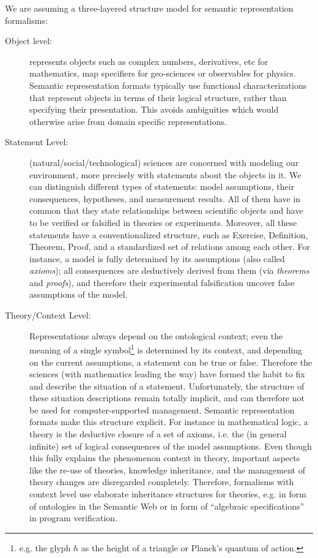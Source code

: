 \documentclass{llncs}
\begin{document}
We are assuming a three-layered structure model for semantic representation
formalisms:\label{page:levels}

\begin{description}
\item[Object level:] represents objects such as complex numbers, derivatives, etc for
  mathematics, map specifiers for geo-sciences or observables for physics.  Semantic
  re\-presentation formats typically use functional characterizations that represent
  objects in terms of their logical structure, rather than specifying their presentation.
  This avoids ambiguities which would otherwise arise from domain specific
  representations.
\item[Statement Level:] (natural/social/technological) sciences are concerned with
  modeling our environment, more precisely with statements about the objects in it. We can
  distinguish different types of statements: model assumptions, their consequences,
  hypotheses, and measurement results. All of them have in common that they state
  relationships between scientific objects and have to be verified or falsified in
  theories or experiments.  Moreover, all these statements have a conventionalized
  structure, such as Exercise, Definition, Theorem, Proof, and a standardized set of
  relations among each other. For instance, a model is fully determined by its assumptions
  (also called {\emph{axioms}}); all consequences are deductively derived from them (via
  {\emph{theorems}} and {\emph{proofs}}), and therefore their experimental falsification
  uncover false assumptions of the model.
\item[Theory/Context Level:] Representations always depend on the ontological context;
  even the meaning of a single symbol\footnote{e.g. the glyph $h$ as the height of a
    triangle or Planck's quantum of action.} is determined by its context, and depending
  on the current assumptions, a statement can be true or false. Therefore the sciences
  (with mathematics leading the way) have formed the habit to fix and describe the
  situation of a statement. Unfortunately, the structure of these situation descriptions
  remain totally implicit, and can therefore not be used for computer-supported
  management. Semantic representation formats make this structure explicit. For instance
  in mathematical logic, a theory is the deductive closure of a set of axioms, i.e. the
  (in general infinite) set of logical consequences of the model assumptions. Even though
  this fully explains the phenomenon context in theory, important aspects like the re-use
  of theories, knowledge inheritance, and the management of theory changes are disregarded
  completely. Therefore, formalisms with context level use elaborate inheritance
  structures for theories, e.g. in form of ontologies in the Semantic Web or in form of
  ``algebraic specifications'' in program verification.
\end{description}
\end{document}
